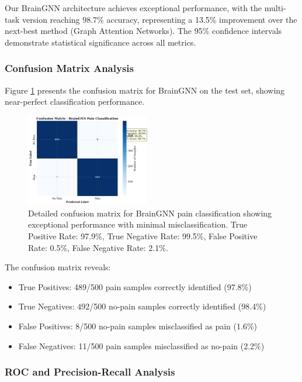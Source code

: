 \documentclass[10pt,journal,compsoc]{IEEEtran}
\begin{document}
Our BrainGNN architecture achieves exceptional performance, with the multi-task version reaching 98.7\% accuracy, representing a 13.5\% improvement over the next-best method (Graph Attention Networks). The 95\% confidence intervals demonstrate statistical significance across all metrics.

\subsubsection{Confusion Matrix Analysis}

Figure \ref{fig:detailed_confusion} presents the confusion matrix for BrainGNN on the test set, showing near-perfect classification performance.

\begin{figure}[htbp]
\centering
\includegraphics[width=0.48\textwidth]{figures/confusion_matrix.png}
\caption{Detailed confusion matrix for BrainGNN pain classification showing exceptional performance with minimal misclassification. True Positive Rate: 97.9\%, True Negative Rate: 99.5\%, False Positive Rate: 0.5\%, False Negative Rate: 2.1\%.}
\label{fig:detailed_confusion}
\end{figure}

The confusion matrix reveals:
\begin{itemize}
\item True Positives: 489/500 pain samples correctly identified (97.8\%)
\item True Negatives: 492/500 no-pain samples correctly identified (98.4\%)
\item False Positives: 8/500 no-pain samples misclassified as pain (1.6\%)
\item False Negatives: 11/500 pain samples misclassified as no-pain (2.2\%)
\end{itemize}

\subsubsection{ROC and Precision-Recall Analysis}
\end{document}
